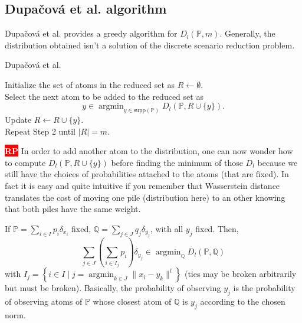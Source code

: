 \documentclass{amsart}
\newcommand{\argmin}{\mathop{\arg\min}}
\newcommand{\nb}[3]{
		{\colorbox{#2}{\bfseries\sffamily\tiny\textcolor{white}{#1}}}
		{\textcolor{#2}{\text{$\blacktriangleright$}{\textcolor{#2}{#3}}\text{$\blacktriangleleft$}}}}
\newcommand{\rp}[1]{\nb{RP}{red}{#1}}
\begin{document}
\subsection{Dupačová et al. algorithm}
Dupačová et al. \cite{dupacova_scenario_2003} provides a greedy algorithm for $D_l\left(\mathbb{P},m\right)$. Generally, the distribution obtained isn't a solution of the discrete scenario reduction problem.
\begin{algorithm}
  \caption{Dupačová et al.}\label{dupacova}
  Initialize the set of atoms in the reduced set as $R\gets \emptyset.$ \\ Select the next atom to be added to the reduced set as $$ y\in\argmin_{y\in \text{supp}\left(\mathbb{P}\right)}D_l\left(\mathbb{P},R\cup\{y\}\right).
  $$
  Update $R\gets R\cup \{y\}$.\\ Repeat Step 2 until $\lvert R\rvert=m$.
\end{algorithm}
\rp{box is too large, don't know how to deal with that}
In order to add another atom to the distribution, one can now wonder how to compute $D_l\left(\mathbb{P},R\cup\{y\}\right)$ before finding the minimum of those $D_l$ because we still have the choices of probabilities attached to the atoms (that are fixed). In fact it is easy and quite intuitive if you remember that Wasserstein distance translates the cost of moving one pile (distribution here) to an other knowing that both piles have the same weight.
\begin{theorem}\label{closed formula}
    If $\mathbb{P}=\sum_{i\in I}p_i\delta_{x_i}$ fixed, $\mathbb{Q}=\sum_{j\in J}q_j\delta_{y_j}$, with all $y_j$ fixed. Then, 
    $$\sum_{j\in J}\left(\sum_{i\in I_j}p_i\right)\delta_{y_j}\in \argmin_\mathbb{Q} D_l\left(\mathbb{P},\mathbb{Q}\right)$$
    with $I_j=\left\{i\in I \mid j=\argmin_{k\in J} \lVert x_i-y_k\rVert^l\right\}$ (ties may be broken arbitrarily but must be broken). Basically, the probability of observing $y_j$ is the probability of observing atoms of $\mathbb{P}$ whose closest atom of $\mathbb{Q}$ is $y_j$ according to the chosen norm.
\end{theorem}
\end{document}
